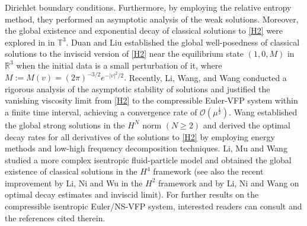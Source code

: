 \documentclass[reqno,11pt]{amsart}
\theoremstyle{plain}
\numberwithin{equation}{section}
\begin{document}
Dirichlet boundary conditions. Furthermore, by employing the relative entropy method, they 
\cite{MV-CMP-2008} performed an asymptotic analysis of the weak solutions. Moreover, 
the global existence and   exponential decay of  classical solutions to \eqref{H2}
were   explored in \cite{CKL-JHDE-2013} in $\mathbb{T}^3$. 
Duan and Liu \cite{DL-KRM-2013} 
established the global well-posedness of classical solutions to the inviscid version of \eqref{H2}  
 near the equilibrium state $(1,0,M)$ in $\mathbb{R}^3$ when the initial data is a   small    perturbation of   it, 
  where $M:=M(v)=(2\pi)^{-{3}/{2}}e^{- {|v|^2}/{2}}.  $  
Recently, Li, Wang, and Wang \cite{LWW-ARMA-2022} conducted a rigorous analysis of the asymptotic 
stability of solutions and justified the vanishing viscosity limit from   \eqref{H2} to the compressible Euler-VFP system within a finite time  {interval}, achieving a 
convergence rate of $\mathcal{O}(\mu^\frac{1}{2})$. 
Wang \cite{Ww-CMS-2024} established the global strong solutions  {in   the $H^N$ norm $(N \geq 2)$}
 and derived the optimal decay rates for all derivatives of the solutions to \eqref{H2} by employing 
 energy methods and low-high frequency decomposition techniques.
Li, Mu and Wang \cite{LMW-SIAM-2017} studied  a   more complex  isentropic fluid-particle model and 
obtained 
the global existence of classical solutions in  the  $H^4$ framework (see also the recent improvement
 by Li, Ni and Wu \cite{LNW-arXiv} in the $H^2$ framework and by Li, Ni and Wang \cite{LNW-1} on optimal decay estimates and inviscid limit).
For further results on the compressible isentropic Euler/NS-VFP system, interested readers can 
consult \cite{CG-2006,LLY22,BD-JHDE-2006,CJ-MMMAS-2021,li-li} and the references cited therein.
\end{document}
